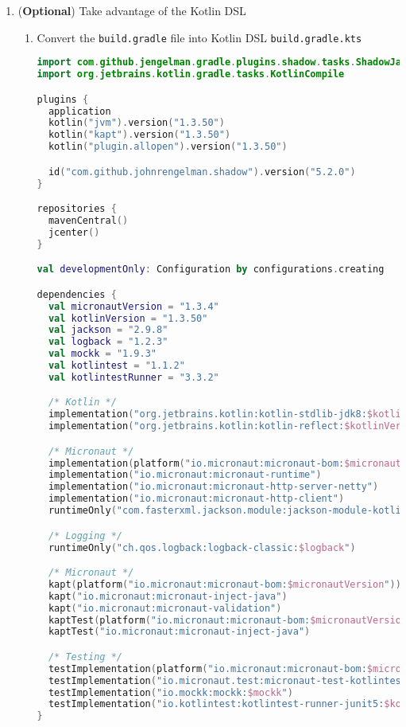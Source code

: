 \begin{enumerate}
\item (\textbf{Optional}) Take advantage of the Kotlin DSL

\begin{enumerate}

\item Convert the \texttt{build.gradle} file into Kotlin DSL \texttt{build.gradle.kts}

\begin{lstlisting}[language=Kotlin]
import com.github.jengelman.gradle.plugins.shadow.tasks.ShadowJar
import org.jetbrains.kotlin.gradle.tasks.KotlinCompile

plugins {
  application
  kotlin("jvm").version("1.3.50")
  kotlin("kapt").version("1.3.50")
  kotlin("plugin.allopen").version("1.3.50")

  id("com.github.johnrengelman.shadow").version("5.2.0")
}

repositories {
  mavenCentral()
  jcenter()
}

val developmentOnly: Configuration by configurations.creating

dependencies {
  val micronautVersion = "1.3.4"
  val kotlinVersion = "1.3.50"
  val jackson = "2.9.8"
  val logback = "1.2.3"
  val mockk = "1.9.3"
  val kotlintest = "1.1.2"
  val kotlintestRunner = "3.3.2"

  /* Kotlin */
  implementation("org.jetbrains.kotlin:kotlin-stdlib-jdk8:$kotlinVersion")
  implementation("org.jetbrains.kotlin:kotlin-reflect:$kotlinVersion")

  /* Micronaut */
  implementation(platform("io.micronaut:micronaut-bom:$micronautVersion"))
  implementation("io.micronaut:micronaut-runtime")
  implementation("io.micronaut:micronaut-http-server-netty")
  implementation("io.micronaut:micronaut-http-client")
  runtimeOnly("com.fasterxml.jackson.module:jackson-module-kotlin:$jackson")

  /* Logging */
  runtimeOnly("ch.qos.logback:logback-classic:$logback")

  /* Micronaut */
  kapt(platform("io.micronaut:micronaut-bom:$micronautVersion"))
  kapt("io.micronaut:micronaut-inject-java")
  kapt("io.micronaut:micronaut-validation")
  kaptTest(platform("io.micronaut:micronaut-bom:$micronautVersion"))
  kaptTest("io.micronaut:micronaut-inject-java")

  /* Testing */
  testImplementation(platform("io.micronaut:micronaut-bom:$micronautVersion"))
  testImplementation("io.micronaut.test:micronaut-test-kotlintest:$kotlintest")
  testImplementation("io.mockk:mockk:$mockk")
  testImplementation("io.kotlintest:kotlintest-runner-junit5:$kotlintestRunner")
}


\end{lstlisting}
\end{enumerate}
\end{enumerate}
